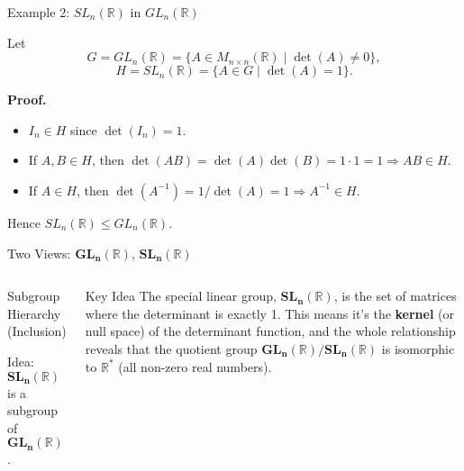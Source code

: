 \begin{frame}{Example 2: $SL_n(\mathbb{R})$ in $GL_n(\mathbb{R})$}
\begin{block}{}
Let
\[
G = GL_n(\mathbb{R}) = \{A\in M_{n\times n}(\mathbb{R}) \mid \det(A)\ne 0\},
\]
\[
H = SL_n(\mathbb{R}) = \{A\in G \mid \det(A)=1\}.
\]

\textbf{Proof.}
\begin{itemize}
  \item \(I_n \in H\) since \(\det(I_n)=1.\)
  \item If \(A,B \in H\), then \(\det(AB)=\det(A)\det(B)=1\cdot1=1 \Rightarrow AB\in H.\)
  \item If \(A\in H\), then \(\det(A^{-1}) = 1/\det(A) = 1 \Rightarrow A^{-1}\in H.\)
\end{itemize}

Hence \(SL_n(\mathbb{R}) \le GL_n(\mathbb{R})\).
\end{block}
\end{frame}

\begin{frame}{Two Views: $\mathbf{GL_n(\mathbb{R})}$, $\mathbf{SL_n(\mathbb{R})}$}
\vspace{-0.3cm}
\centering
\begin{columns}
\vspace{-0.3cm}
\begin{block}{Subgroup Hierarchy (Inclusion)}
\begin{center}
\end{center}
\vspace*{0.5em}
\alert{Idea:} $\mathbf{SL_n(\mathbb{R})}$ is a subgroup of $\mathbf{GL_n(\mathbb{R})}$.
\end{block}

\vspace{-0.3cm}

\begin{alertblock}{Key Idea}
The special linear group, $\mathbf{SL_n(\mathbb{R})}$, is the set of matrices where the determinant is exactly 1. This means it's the \textbf{kernel} (or null space) of the determinant function, and the whole relationship reveals that the quotient group $\mathbf{GL_n(\mathbb{R})} / \mathbf{SL_n(\mathbb{R})}$ is isomorphic to $\mathbf{\mathbb{R}^*}$ (all non-zero real numbers).
\end{alertblock}
\end{columns}

\end{frame}

